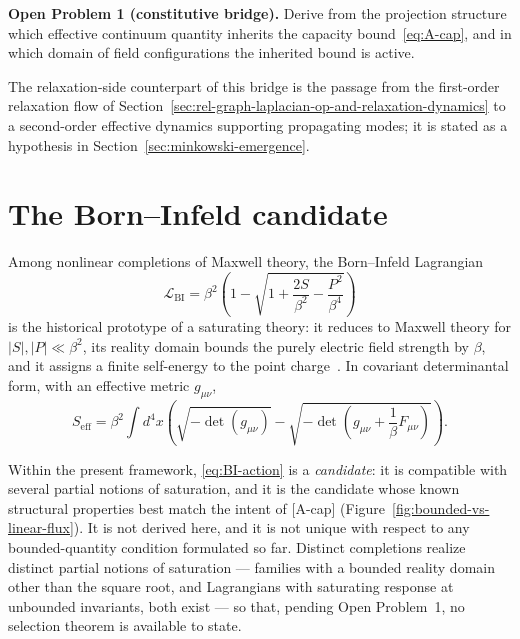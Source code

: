 \documentclass[epj]{svjour}
\begin{document}
    \medskip
    \noindent\textbf{Open Problem 1 (constitutive bridge).}
    Derive from the projection structure which effective continuum quantity inherits the capacity
    bound~\eqref{eq:A-cap}, and in which domain of field configurations the inherited bound is
    active.
    \medskip

    The relaxation-side counterpart of this bridge is the passage from the first-order relaxation
    flow of Section~\ref{sec:rel-graph-laplacian-op-and-relaxation-dynamics} to a second-order
    effective dynamics supporting propagating modes; it is stated as a hypothesis in
    Section~\ref{sec:minkowski-emergence}.

  \section{The Born--Infeld candidate}
    \label{sec:bi-candidate}

    Among nonlinear completions of Maxwell theory, the Born--Infeld
    Lagrangian~\cite{BornInfeld}
    \begin{equation}
      \mathcal{L}_{\mathrm{BI}} =
      \beta^2 \left(
                1 - \sqrt{1 + \frac{2S}{\beta^2}
          - \frac{P^2}{\beta^4}}
      \right)
      \label{eq:BI-lagrangian}
    \end{equation}
    is the historical prototype of a saturating theory:
    it reduces to Maxwell theory for $|S|, |P| \ll \beta^2$, its reality domain bounds the purely
    electric field strength by $\beta$, and it assigns a finite self-energy to the point
    charge~\cite{BornInfeld,Gibbons1998}.
    In covariant determinantal form, with an effective metric $g_{\mu\nu}$,
    \begin{equation}
      S_{\mathrm{eff}}
      = \beta^2 \int d^4x
      \left(
        \sqrt{-\det(g_{\mu\nu})}
        - \sqrt{-\det\!\left(g_{\mu\nu} + \frac{1}{\beta} F_{\mu\nu}\right)}
      \right).
      \label{eq:BI-action}
    \end{equation}

    Within the present framework, \eqref{eq:BI-action} is a \emph{candidate}: it is compatible with
    several partial notions of saturation, and it is the candidate whose known structural
    properties best match the intent of [A-cap]
    (Figure~\ref{fig:bounded-vs-linear-flux}).
    It is not derived here, and it is not unique with respect to any bounded-quantity condition
    formulated so far.
    Distinct completions realize distinct partial notions of saturation --- families with a bounded
    reality domain other than the square root, and Lagrangians with saturating response at unbounded
    invariants, both exist --- so that, pending Open Problem~1, no selection theorem is available to
    state.
\end{document}

